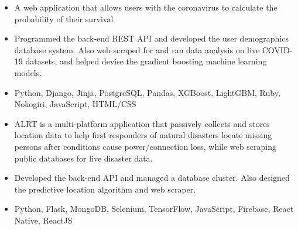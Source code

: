 \documentclass[11pt,letterpaper]{article}
\begin{document}
  \ifcovidsurvivalcalculator
    {\fontsize{12}{12}}

    \begin{itemize}
      \item{A web application that allows users with the coronavirus to calculate the probability of their survival}

      \item{Programmed the back-end REST API and developed the user demographics database system. Also web scraped for and ran data analysis on live COVID-19 datasets, and helped devise the gradient boosting machine learning models.}

      \item{
        {}
        Python, Django, Jinja, PostgreSQL, Pandas, XGBoost, LightGBM, Ruby, Nokogiri, JavaScript, HTML/CSS
      }
    \end{itemize}
  \fi

  \ifalrt
    {\fontsize{12}{12}}

    \begin{itemize}
      \item{ALRT is a multi-platform application that passively collects and stores location data to help first responders of natural disasters locate missing persons after conditions cause power/connection loss, while web scraping public databases for live disaster data.}

      \item{Developed the back-end API and managed a database cluster. Also designed the predictive location algorithm and web scraper.}

      \item{
        {}
        Python, Flask, MongoDB, Selenium, TensorFlow, JavaScript, Firebase, React Native, ReactJS
      }
    \end{itemize}
  \fi

  \iffirestorm
    {\fontsize{12}{12}}
\end{document}
